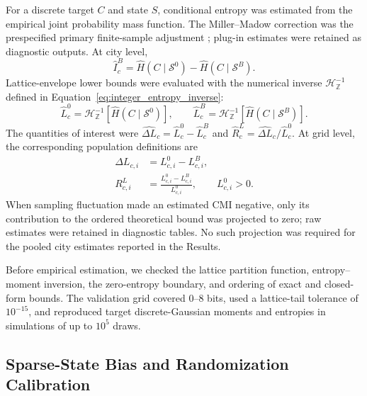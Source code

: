 For a discrete target \(C\) and state \(S\), conditional entropy was
estimated from the empirical joint probability mass function. The
Miller--Madow correction was the prespecified primary finite-sample
adjustment \citep{miller1955}; plug-in estimates were retained as diagnostic
outputs. At city level,
\begin{equation}
\widehat I^{B}_{c}
=\widehat H(C\mid\mathcal{S}^{0})
-\widehat H(C\mid\mathcal{S}^{B}).
\label{eq:empirical_cmi}
\end{equation}
Lattice-envelope lower bounds were evaluated with the numerical inverse
\(\mathcal H_{\mathbb Z}^{-1}\) defined in
Equation~\eqref{eq:integer_entropy_inverse}:
\begin{equation}
\widehat L^0_c
=\mathcal H_{\mathbb Z}^{-1}
\!\left[\widehat H(C\mid\mathcal S^0)\right],
\qquad
\widehat L^B_c
=\mathcal H_{\mathbb Z}^{-1}
\!\left[\widehat H(C\mid\mathcal S^B)\right].
\label{eq:empirical_exact_bounds}
\end{equation}
The quantities of interest were
\(\widehat{\Delta L}_c=\widehat L^0_c-\widehat L^B_c\) and
\(\widehat R^L_c=\widehat{\Delta L}_c/\widehat L^0_c\).
At grid level, the corresponding population definitions are
\begin{align}
\Delta L_{c,i}
&=L^0_{c,i}-L^B_{c,i},
\label{eq:absolute_bound_reduction}\\
R^L_{c,i}
&=\frac{L^0_{c,i}-L^B_{c,i}}{L^0_{c,i}},
\qquad L^0_{c,i}>0.
\label{eq:relative_bound_reduction}
\end{align}
When sampling fluctuation made an estimated CMI negative, only its
contribution to the ordered theoretical bound was projected to zero; raw
estimates were retained in diagnostic tables. No such projection was
required for the pooled city estimates reported in the Results.

Before empirical estimation, we checked the lattice partition
function, entropy--moment inversion, the zero-entropy boundary, and ordering
of exact and closed-form bounds. The validation grid covered
0--8 bits, used a lattice-tail tolerance of \(10^{-15}\), and reproduced
target discrete-Gaussian moments and entropies in simulations of up to
\(10^5\) draws.

\subsection{Sparse-State Bias and Randomization Calibration}
\label{subsec:three_inference_layers}

